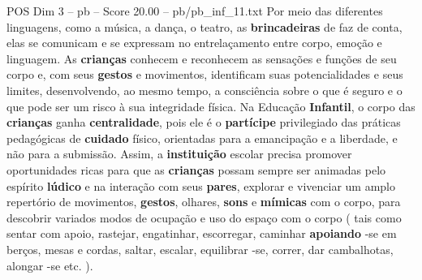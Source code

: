 \begin{textsample}{POS Dim 3 – pb – Score 20.00 – pb/pb\_inf\_11.txt}
Por meio das diferentes linguagens, como a música, a dança, o teatro, as \textbf{brincadeiras} de faz de conta, elas se comunicam e se expressam no entrelaçamento entre corpo, emoção e linguagem.
As \textbf{crianças} conhecem e reconhecem as sensações e funções de seu corpo e, com seus \textbf{gestos} e movimentos, identificam suas potencialidades e seus limites, desenvolvendo, ao mesmo tempo, a consciência sobre o que é seguro e o que pode ser um risco à sua integridade física.
Na Educação \textbf{Infantil}, o corpo das \textbf{crianças} ganha \textbf{centralidade}, pois ele é o \textbf{partícipe} privilegiado das práticas pedagógicas de \textbf{cuidado} físico, orientadas para a emancipação e a liberdade, e não para a submissão.
Assim, a \textbf{instituição} escolar precisa promover oportunidades ricas para que as \textbf{crianças} possam sempre ser animadas pelo espírito \textbf{lúdico} e na interação com seus \textbf{pares}, explorar e vivenciar um amplo repertório de movimentos, \textbf{gestos}, olhares, \textbf{sons} e \textbf{mímicas} com o corpo, para descobrir variados modos de ocupação e uso do espaço com o corpo ( tais como sentar com apoio, rastejar, engatinhar, escorregar, caminhar \textbf{apoiando} -se em berços, mesas e cordas, saltar, escalar, equilibrar -se, correr, dar cambalhotas, alongar -se etc. ).

\end{textsample}
